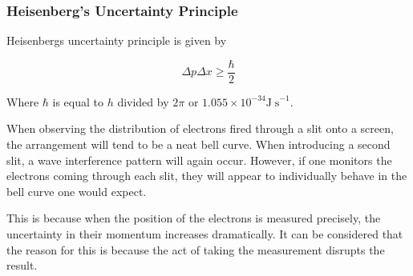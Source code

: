 \documentclass[12pt]{report}
\begin{document}
\begin{flushleft}
\subsubsection*{Heisenberg's Uncertainty Principle}

Heisenbergs uncertainty principle is given by

\[\Delta p\Delta x \geq \frac{\hbar}{2}\]

Where \(\hbar\) is equal to \(h\) divided by \(2\pi\) or
\(1.055\times10^{-34}\mathrm{J\;s}^{-1}\). \par
When observing the distribution of electrons fired through a slit onto a
screen, the arrangement will tend to be a neat bell curve. When introducing
a second slit, a wave interference pattern will again occur. However, if one
monitors the electrons coming through each slit, they will appear to
individually behave in the bell curve one would expect. \par
This is because when the position of the electrons is measured precisely, the
uncertainty in their momentum increases dramatically. It can be considered that
the reason for this is because the act of taking the measurement disrupts the
result. 

\end{flushleft}
\end{document}
